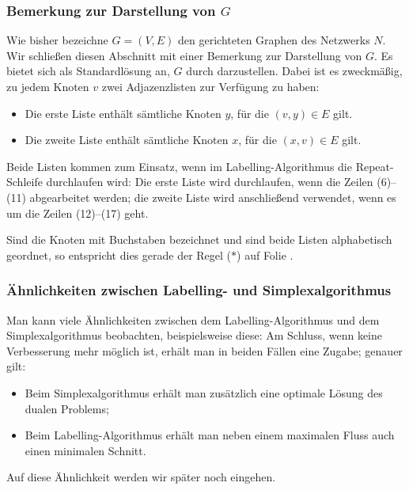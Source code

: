 \documentclass[smaller]{beamer}
\begin{document}
\begin{frame}
 \frametitle{Bemerkung zur Darstellung von $G$}
 Wie bisher bezeichne $G=(V,E)$ den gerichteten Graphen des Netzwerks $N$. Wir schließen diesen Abschnitt mit einer Bemerkung zur \alert{Darstellung von $G$}. Es bietet sich als Standardlösung an, $G$ durch  darzustellen. Dabei ist es zweckmäßig, zu jedem Knoten $v$ \alert{zwei} Adjazenzlisten zur Verfügung zu haben: \\ \vspace*{0.2cm}
\begin{itemize}
\item Die erste Liste enthält sämtliche Knoten $y$, für die $(v,y) \in E$ gilt.
\item Die zweite Liste enthält sämtliche Knoten $x$, für die $(x,v) \in E$ gilt.
\end{itemize}
\vspace*{0.2cm}

Beide Listen kommen zum Einsatz, wenn im Labelling-Algorithmus die Repeat-Schleife durchlaufen wird: Die erste Liste wird durchlaufen, wenn die Zeilen (6)--(11) abgearbeitet werden; die zweite Liste wird anschließend verwendet, wenn es um die Zeilen (12)--(17) geht.  \\ \vspace*{0.2cm}

Sind die Knoten mit Buchstaben bezeichnet und sind beide Listen alphabetisch geordnet, so entspricht dies gerade der Regel ($*$) auf Folie \pageref{page:9:8}.
\end{frame}

\begin{frame}
 \frametitle{Ähnlichkeiten zwischen Labelling- und Simplexalgorithmus}
 Man kann viele \alert{Ähnlichkeiten} zwischen dem Labelling-Algorithmus und dem Simplexalgorithmus beobachten, beispielsweise diese: Am Schluss, wenn keine Verbesserung mehr möglich ist, erhält man in beiden Fällen eine \alert{{\glqq}Zugabe{\grqq}}; genauer gilt: \\ \vspace*{0.2cm}
 \begin{itemize}
  \item Beim Simplexalgorithmus erhält man zusätzlich eine optimale Lösung   
      des dualen Problems;
  \item Beim Labelling-Algorithmus erhält man neben einem maximalen Fluss 
     auch einen minimalen Schnitt.
 \end{itemize}
 \vspace*{0.2cm}
 
Auf diese Ähnlichkeit werden wir später noch eingehen.
\end{frame}
\end{document}
